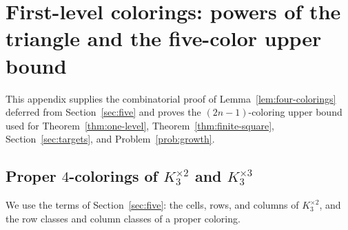 \section{First-level colorings: powers of the triangle and the five-color upper bound}\label{app:four}

This appendix supplies the combinatorial proof of Lemma~\ref{lem:four-colorings} deferred from Section~\ref{sec:five} and proves the $(2n-1)$-coloring upper bound used for Theorem~\ref{thm:one-level}, Theorem~\ref{thm:finite-square}, Section~\ref{sec:targets}, and Problem~\ref{prob:growth}.

\subsection{Proper \texorpdfstring{$4$}{4}-colorings of \texorpdfstring{$K_3^{\times2}$}{K3xK3} and \texorpdfstring{$K_3^{\times3}$}{K3xK3xK3}}\label{app:k3-four}

We use the terms of Section~\ref{sec:five}: the cells, rows, and columns of $K_3^{\times2}$, and the row classes and column classes of a proper coloring.

